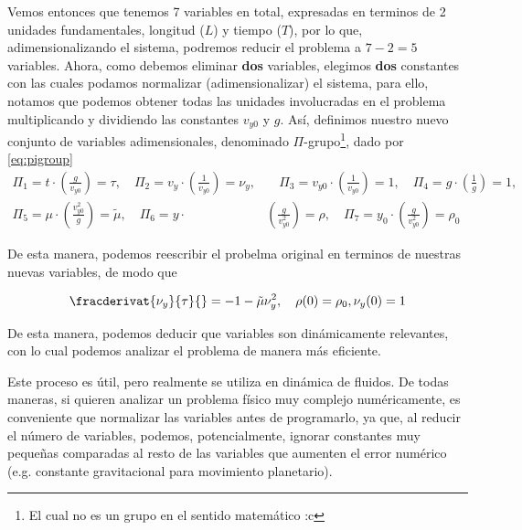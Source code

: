 Vemos entonces que tenemos 7 variables en total, expresadas en terminos de 2 unidades fundamentales, longitud ($L$) y tiempo ($T$), por lo que, adimensionalizando el sistema, podremos reducir el problema a $7-2 = 5$ variables. Ahora, como debemos eliminar \textbf{dos} variables, elegimos \textbf{dos} constantes con las cuales podamos normalizar (adimensionalizar) el sistema, para ello, notamos que podemos obtener todas las unidades involucradas en el problema multiplicando y dividiendo las constantes $v_{y0}$ y $g$. Así, definimos nuestro nuevo conjunto de variables adimensionales, denominado $\Pi$-grupo\footnote{El cual no es un grupo en el sentido matemático :c}, dado por \eqref{eq:pigroup}
\begin{equation} \label{eq:pigroup}
  \begin{aligned}
    \Pi_{1} = t\cdot \left( \frac{g}{v_{y0}} \right) = \tau, \quad 
    \Pi_{2} = v_{y}\cdot \left( \frac{1}{v_{y0}} \right) = \nu_{y},& \quad 
    \Pi_{3} = v_{y0} \cdot \left( \frac{1}{v_{y0}} \right) = 1, \quad
    \Pi_{4} = g \cdot \left( \frac{1}{g} \right) = 1, \quad \\
    \Pi_{5} = \mu \cdot \left( \frac{v_{y0}^{2}}{g} \right) = \tilde{\mu}, \quad
    \Pi_{6} = y\cdot & \left( \frac{g}{v_{y0}^{2}} \right) = \rho, \quad
    \Pi_{7} = y_{0} \cdot \left( \frac{g}{v_{y0}^{2}} \right) = \rho_{0}  
  \end{aligned}
\end{equation}

De esta manera, podemos reescribir el probelma original en terminos de nuestras nuevas variables, de modo que

\begin{equation}
  \fracderivat{\nu_{y}}{\tau}{} = -1 -\tilde{\mu} \nu_{y}^{2}, \quad \rho(0) = \rho_{0}, \nu_{y}(0) = 1
 \end{equation}
 
 De esta manera, podemos deducir que variables son dinámicamente relevantes, con lo cual podemos analizar el problema de manera más eficiente.

 Este proceso es útil, pero realmente se utiliza en dinámica de fluidos. De todas maneras, si quieren analizar un problema físico muy complejo numéricamente, es conveniente que normalizar las variables antes de programarlo, ya que, al reducir el número de variables, podemos, potencialmente, ignorar constantes muy pequeñas comparadas al resto de las variables que aumenten el error numérico (e.g. constante gravitacional para movimiento planetario).


